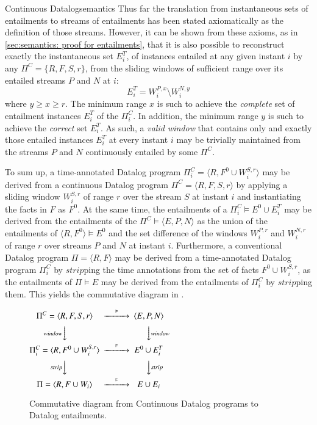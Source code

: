 \begin{nestedsection}{Continuous Datalog}{semantics}
Thus far the translation from instantaneous sets of entailments to
streams of entailments has been stated axiomatically as the definition
of those streams.  However, it can be shown from these axioms, as in
\ref{sec:semantics: proof for entailments}, that it is also possible
to reconstruct exactly the instantaneous set $E^T_{i}$, of instances
entailed at any given instant $i$ by any $\Pi^C = \{ R, F, S, r \}$,
from the sliding windows of sufficient range over its entailed streams
$P$ and $N$ at $i$:
\[ E^T_{i} = W^{P,x}_{i} \setminus W^{N,y}_{i} \]
where ${y \geq x \geq r}$. The minimum range $x$ is such to achieve
the \emph{complete} set of entailment instances $E^T_{i}$ of the
$\Pi^C_{i}$. In addition, the minimum range $y$ is such to achieve the
\emph{correct} set $E^T_{i}$. As such, a \emph{valid window} that
contains only and exactly those entailed instances $E^T_{i}$ at every
instant $i$ may be trivially maintained from the streams $P$ and $N$
continuously entailed by some $\Pi^C$.

To sum up, a time-annotated Datalog program
${\Pi^C_i = \langle R, F^0 \cup W^{S,r}_i \rangle}$ may be derived from
a continuous Datalog program ${\Pi^C = \langle R, F, S, r \rangle}$ by
applying a sliding window $W^{S,r}_i$ of range $r$ over the stream $S$ at
instant $i$ and instantiating the facts in $F$ as $F^0$. At the same time,
the entailments of a ${\Pi^C_i \vDash E^0 \cup E^T_i}$ may be derived from
the entailments of the ${\Pi^C \vDash \langle E, P, N \rangle}$ as the union
of the entailments of ${\langle R, F^0 \rangle \vDash E^0}$ and the set
difference of the windows $W^{P,r}_i$ and $W^{N,r}_i$ of range $r$ over
streams $P$ and $N$ at instant $i$.
Furthermore, a conventional Datalog program ${\Pi = \langle R, F \rangle}$
may be derived from a time-annotated Datalog program $\Pi^C_i$ by
${strip}$ping the time annotations from the set of facts
${F^0 \cup W^{S,r}_i}$, as the entailments of ${\Pi \vDash E}$ may be
derived from the entailments of $\Pi^C_i$ by $strip$ping them.
This yields the commutative diagram in .
\begin{figure}
	\centering
	$
	\begin{CD}
		{\Pi^C = \langle R, F, S, r \rangle} @>\vDash>> {\langle E, P, N \rangle} \\
		@V{window}VV @VV{window}V \\
		{\Pi^C_i = \langle R, F^0 \cup W^{S,r}_i \rangle} @>\vDash>> {E^0 \cup E^T_i} \\
		@V{strip}VV @VV{strip}V \\
		{\Pi = \langle R, F \cup W_i \rangle} @>\vDash>> {E \cup E_i}
	\end{CD}
	$
	\caption{Commutative diagram from Continuous Datalog programs to Datalog entailments.}
\end{figure}
\end{nestedsection}
